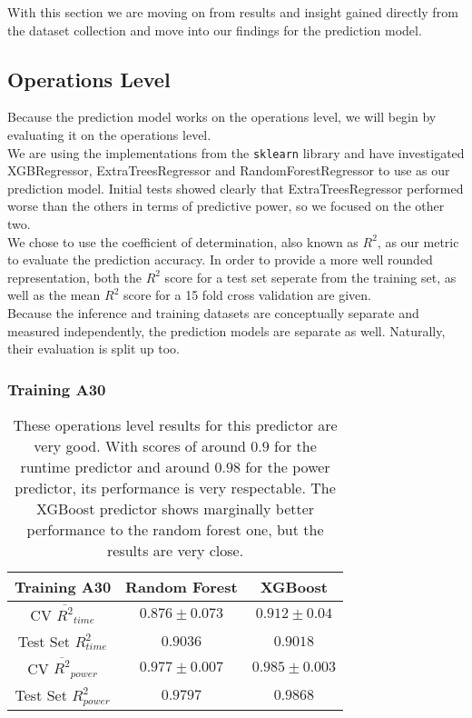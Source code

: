With this section we are moving on from results and insight gained directly from the dataset collection and move into our findings for the prediction model.

\subsection{Operations Level}

Because the prediction model works on the operations level, we will begin by evaluating it on the operations level. \\
We are using the implementations from the \texttt{sklearn} library and have investigated XGBRegressor, ExtraTreesRegressor and RandomForestRegressor to use as our prediction model. Initial tests showed clearly that ExtraTreesRegressor performed worse than the others in terms of predictive power, so we focused on the other two. \\
We chose to use the coefficient of determination, also known as $R^2$, as our metric to evaluate the prediction accuracy. In order to provide a more well rounded representation, both the $R^2$ score for a test set seperate from the training set, as well as the mean $R^2$ score for a 15 fold cross validation are given. \\
Because the inference and training datasets are conceptually separate and measured independently, the prediction models are separate as well. Naturally,  their evaluation is split up too.


\subsubsection{Training A30}



\begin{table}[h!]
\centering
\begin{tabular}{|c|c|c|}
\hline
 \textbf{Training A30}& \textbf{Random Forest} & \textbf{XGBoost} \\
\hline
CV $\overline{R^2}_{time}$ & $0.876 \pm 0.073$ &  $0.912 \pm 0.04$ \\
\hline
Test Set $R^2_{time}$ & $0.9036$ & $0.9018$ \\
\hline
CV $\overline{R^2}_{power}$ & $0.977 \pm 0.007$  &  $0.985 \pm 0.003$\\
\hline
Test Set $R^2_{power}$ & $0.9797$ & $0.9868$ \\
\hline
\end{tabular}
\caption{These operations level results for this predictor are very good. With scores of around $0.9$ for the runtime predictor and around $0.98$ for the power predictor, its performance is very respectable. The XGBoost predictor shows marginally better performance to the random forest one, but the results are very close.}
\label{tab:pred_res}
\end{table}


